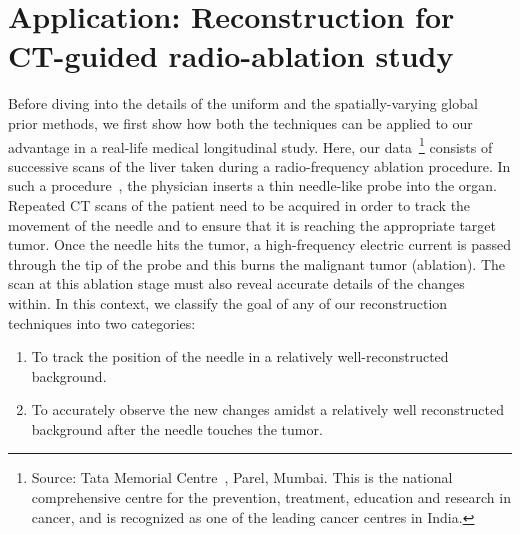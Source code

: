 \documentclass[journal]{IEEEtran}
\begin{document}
\section{Application: Reconstruction for CT-guided radio-ablation study}
\label{sec:tmh}
Before diving into the details of the uniform and the
spatially-varying global prior methods, we first show how both the
techniques can be applied to our advantage in a real-life medical
longitudinal study. Here, our data~\footnote{Source: Tata Memorial
  Centre~\cite{tmh}, Parel, Mumbai.  This is the national
  comprehensive centre for the prevention, treatment, education and
  research in cancer, and is recognized as one of the leading cancer
  centres in India.} consists of successive scans of the liver taken
during a radio-frequency ablation procedure. In such a
procedure~\cite{Dong2015}, the physician inserts a thin needle-like
probe into the organ. Repeated CT scans of the patient need to be
acquired in order to track the movement of the needle and to ensure
that it is reaching the appropriate target tumor. Once the needle hits
the tumor, a high-frequency electric current is passed through the tip
of the probe and this burns the malignant tumor (ablation). The scan
at this ablation stage must also reveal accurate details of the
changes within. In this context, we classify the goal of any of our
reconstruction techniques into two categories: 
\begin{enumerate}
\item To track the position of the needle in a relatively well-reconstructed background.%
\item To accurately observe the new changes amidst a relatively well reconstructed background after the needle touches the tumor.%
\end{enumerate} 
\end{document}
